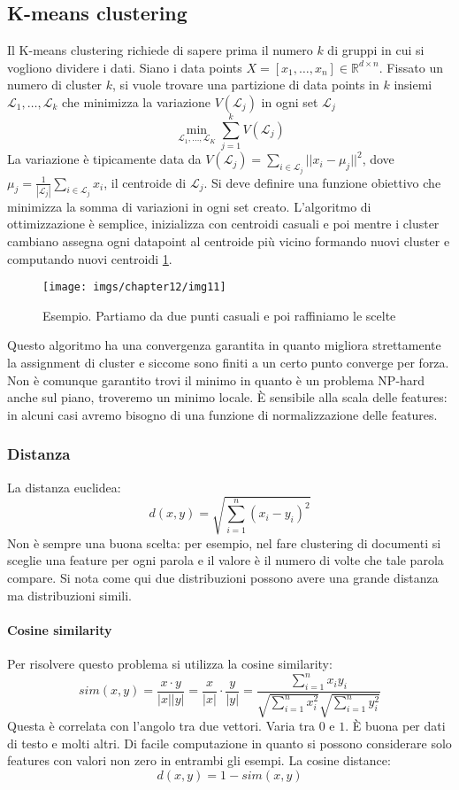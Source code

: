 	\subsection{K-means clustering}
	Il K-means clustering richiede di sapere prima il numero $k$ di gruppi in cui si vogliono dividere i dati.
	Siano i data points $X=[x_1,\dots,x_n]\in\mathbb{R}^{d\times n}$.
	Fissato un numero di cluster $k$, si vuole trovare una partizione di data points in $k$ insiemi $\mathcal{L}_1,\dots,\mathcal{L}_k$ che minimizza la variazione $V(\mathcal{L}_j)$ in ogni set $\mathcal{L}_j$
	$$\min\limits_{\mathcal{L}_1,\dots,\mathcal{L}_K}\sum\limits_{j = 1}^kV(\mathcal{L}_j)$$
	La variazione \`e tipicamente data da $V(\mathcal{L}_j) = \sum\limits_{i\in\mathcal{L}_j}||x_i-\mu_j||^2$, dove $\mu_j = \frac{1}{|\mathcal{L}_j|}\sum\limits_{i\in\mathcal{L}_j}x_i$, il centroide di $\mathcal{L}_j$.
	Si deve definire una funzione obiettivo che minimizza la somma di variazioni in ogni set creato.
	L'algoritmo di ottimizzazione \`e semplice, inizializza con centroidi casuali e poi mentre i cluster cambiano assegna ogni datapoint al centroide pi\`u vicino formando nuovi cluster e computando nuovi centroidi \ref{fig:chapter12-11}.
	\begin{figure}
		\centering
		\texttt{[image: imgs/chapter12/img11]}
		\caption{Esempio. Partiamo da due punti casuali e poi raffiniamo le scelte}
		\label{fig:chapter12-11}
	\end{figure}
	
	Questo algoritmo ha una convergenza garantita in quanto migliora strettamente la assignment di cluster e siccome sono finiti a un certo punto converge per forza.
	Non \`e comunque garantito trovi il minimo in quanto \`e un problema NP-hard anche sul piano, troveremo un minimo locale.
	\`E sensibile alla scala delle features: in alcuni casi avremo bisogno di una funzione di normalizzazione delle features.

		\subsubsection{Distanza}
		La distanza euclidea:
		$$d(x,y) = \sqrt{\sum\limits_{i=1}^n(x_i-y_i)^2}$$
		Non \`e sempre una buona scelta: per esempio, nel fare clustering di documenti si sceglie una feature per ogni parola e il valore \`e il numero di volte che tale parola compare.
		Si nota come qui due distribuzioni possono avere una grande distanza ma distribuzioni simili.
		
		\paragraph{Cosine similarity}
		Per risolvere questo problema si utilizza la cosine similarity:
		$$sim(x,y) = \frac{x\cdot y}{|x||y|} = \frac{x}{|x|}\cdot\frac{y}{|y|} = \frac{\sum\limits_{i = 1}^n x_iy_i}{\sqrt{\sum\limits_{i = 1}^n x_i^2}\sqrt{\sum\limits_{i = 1}^ny_i^2}}$$
		Questa \`e correlata con l'angolo tra due vettori.
		Varia tra $0$ e $1$.
		\`E buona per dati di testo e molti altri.
		Di facile computazione in quanto si possono considerare solo features con valori non zero in entrambi gli esempi.
		La cosine distance:
		$$d(x,y) = 1-sim(x,y)$$
		
